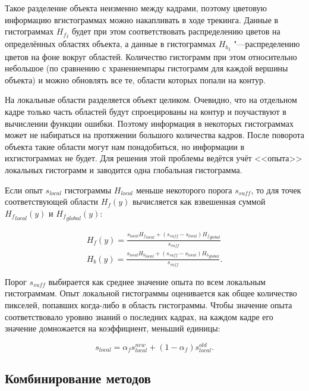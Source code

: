 Такое разделение объекта неизменно между кадрами, поэтому цветовую информацию
вгистограммах можно накапливать в ходе трекинга.
Данные в гистограммах ${H_f}_i$ будет при этом соответствовать распределению
цветов на определённых областях объекта, а данные в гистограммах ${H_b}_i$
"---распределению цветов на фоне вокруг областей.
Количество гистограмм при этом относительно небольшое (по сравнению с
хранениемпары гистограмм для каждой вершины объекта) и можно обновлять все те,
области
которых попали на контур.

На локальные области разделяется объект целиком. 
Очевидно, что на отдельном кадре только часть областей будут спроецированы на
контур и поучаствуют в вычислении функции ошибки.
Поэтому информация в некоторых гистограммах может не набираться на протяжении
большого количества кадров.
После поворота объекта такие области могут нам понадобиться, но информации в
ихгистограммах не будет.
Для решения этой проблемы ведётся учёт <<опыта>> локальных гистограмм и
заводится одна глобальная гистограмма.

Если опыт $s_{local}$ гистограммы $H_{local}$ меньше некоторого порога
$s_{suff}$, то для точек соответствующей области $H_f(y)$ вычисляется как
взвешенная суммой ${H_f}_{local}(y)$ и ${H_f}_{global}(y)$:

\begin{equation}
\label{eqn:histo_skill}
\begin{array}{c}
H_f(y) = \frac{s_{local} {H_f}_{local} + (s_{suff} - s_{local})
{H_f}_{global}}{s_{suff}} \\
H_b(y) = \frac{s_{local} {H_b}_{local} + (s_{suff} - s_{local})
{H_b}_{global}}{s_{suff}}
\text{.}
\end{array}
\end{equation}

Порог $s_{suff}$ выбирается как среднее значение опыта по всем локальным
гистограммам.
Опыт локальной гистограммы оценивается как общее количество пикселей, попавших
когда-либо в область гистограммы.
Чтобы значение опыта соответствовало уровню знаний о последних кадрах, на
каждом кадре его значение домножается на коэффициент, меньший единицы:

\begin{equation}
s_{local} =  \alpha_f s_{local}^{new} + (1 - \alpha_f)  s_{local}^{old} 
\text{.}
\end{equation}


\subsection{Комбинирование методов}

